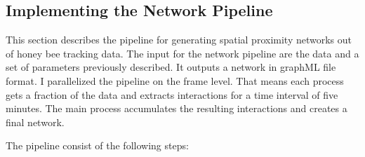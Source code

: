 \subsection{Implementing the Network Pipeline}

This section describes the pipeline for generating spatial proximity networks out of honey bee tracking data.
The input for the network pipeline are the data and a set of parameters previously described.
It outputs a network in graphML file format.
I parallelized the pipeline on the frame level.
That means each process gets a fraction of the data and extracts interactions for a time interval of five minutes. The main process accumulates the resulting interactions and creates a final network.

The pipeline consist of the following steps:

